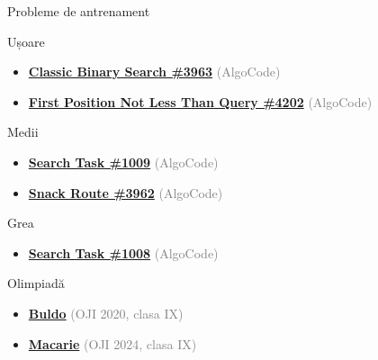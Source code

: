 ﻿\documentclass{beamer}
\begin{document}
\begin{frame}{Probleme de antrenament}
  \begin{block}{Ușoare}
    \begin{itemize}\footnotesize\itemsep0pt
      \item \href{https://code.algolymp.com/problems/3963}{\textbf{Classic Binary Search \#3963}} {\footnotesize\textcolor{gray}{(AlgoCode)}}
      \item \href{https://code.algolymp.com/problems/4202}{\textbf{First Position Not Less Than Query \#4202}} {\footnotesize\textcolor{gray}{(AlgoCode)}}
    \end{itemize}
  \end{block}
  \vspace{-4pt}
  \begin{block}{Medii}
    \begin{itemize}\footnotesize\itemsep0pt
      \item \href{https://code.algolymp.com/problems/1009}{\textbf{Search Task \#1009}} {\footnotesize\textcolor{gray}{(AlgoCode)}}
      \item \href{https://code.algolymp.com/problems/3962}{\textbf{Snack Route \#3962}} {\footnotesize\textcolor{gray}{(AlgoCode)}}
    \end{itemize}
  \end{block}
  \vspace{-4pt}
  \begin{block}{Grea}
    \begin{itemize}\footnotesize\itemsep0pt
      \item \href{https://code.algolymp.com/problems/1008}{\textbf{Search Task \#1008}} {\footnotesize\textcolor{gray}{(AlgoCode)}}
    \end{itemize}
  \end{block}
  \vspace{-4pt}
  \begin{block}{Olimpiadă}
    \begin{itemize}\footnotesize\itemsep0pt
      \item \href{https://code.algolymp.com/problems/1916}{\textbf{Buldo}} {\footnotesize\textcolor{gray}{(OJI 2020, clasa IX)}}
      \item \href{https://code.algolymp.com/problems/2984}{\textbf{Macarie}} {\footnotesize\textcolor{gray}{(OJI 2024, clasa IX)}}
    \end{itemize}
  \end{block}
\end{frame}
\end{document}
